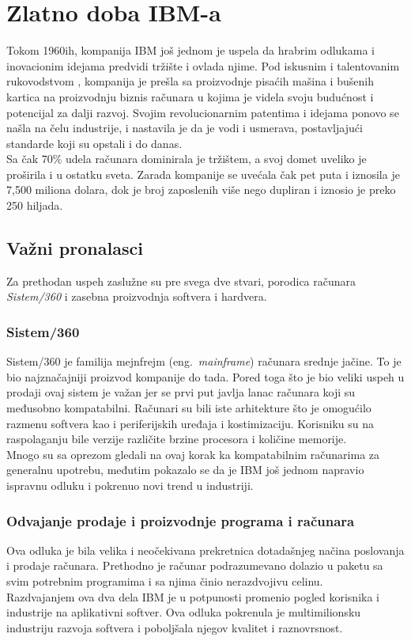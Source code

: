 \documentclass[a4paper]{article}
\begin{document}
\section{Zlatno doba IBM-a}%
Tokom 1960ih, kompanija IBM još jednom je uspela da hrabrim odlukama i inovacionim idejama predvidi tržište i ovlada njime. Pod iskusnim i talentovanim rukovodstvom%
, kompanija je prešla sa proizvodnje pisaćih mašina i bušenih kartica na proizvodnju biznis računara u kojima je videla svoju budućnost i potencijal za dalji razvoj.
Svojim revolucionarnim patentima i idejama ponovo se našla na čelu industrije, i nastavila je da je vodi i usmerava, postavljajući standarde koji su opstali i do danas.\\
Sa čak 70\% udela računara dominirala je tržištem,%
 a svoj domet uveliko je proširila i u ostatku sveta. Zarada kompanije se uvećala čak pet puta i iznosila je 7,500 miliona dolara, dok je broj zaposlenih više nego dupliran i iznosio je preko 250 hiljada. %
\subsection{Važni pronalasci} 
Za prethodan uspeh zaslužne su pre svega dve stvari, porodica računara \emph{Sistem/360}  i zasebna proizvodnja softvera i hardvera.
\subsubsection*{Sistem/360}Sistem/360 je familija mejnfrejm (eng.~{\em mainframe}) računara srednje jačine. To je bio najznačajniji proizvod kompanije do tada. Pored toga što je bio veliki uspeh u prodaji ovaj sistem je važan jer se prvi put javlja lanac računara koji su međusobno kompatabilni.
Računari su bili iste arhitekture što je omogućilo razmenu softvera kao i periferijskih uređaja i kostimizaciju. Korisniku su na raspolaganju bile verzije različite brzine procesora i količine memorije. \\%
Mnogo su sa oprezom gledali na ovaj korak ka kompatabilnim računarima za generalnu upotrebu, međutim pokazalo se da je IBM još jednom napravio ispravnu odluku i pokrenuo novi trend u industriji.%
\subsubsection*{Odvajanje prodaje i proizvodnje programa i računara} Ova odluka je bila velika i neočekivana prekretnica dotadašnjeg načina poslovanja i prodaje računara. Prethodno je računar podrazumevano dolazio u paketu sa svim potrebnim programima i sa njima činio nerazdvojivu celinu.\\
Razdvajanjem ova dva dela IBM je u potpunosti promenio pogled korisnika i industrije na aplikativni softver. Ova odluka pokrenula je multimilionsku industriju razvoja softvera i poboljšala njegov kvalitet i raznovrsnost. 
\end{document}
